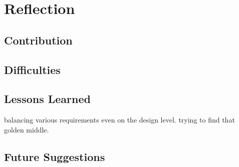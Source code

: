 \section{Reflection}
\subsection{Contribution}


\subsection{Difficulties}

\subsection{Lessons Learned}
balancing various requirements even on the design level. trying to find that golden middle.

\subsection{Future Suggestions}
